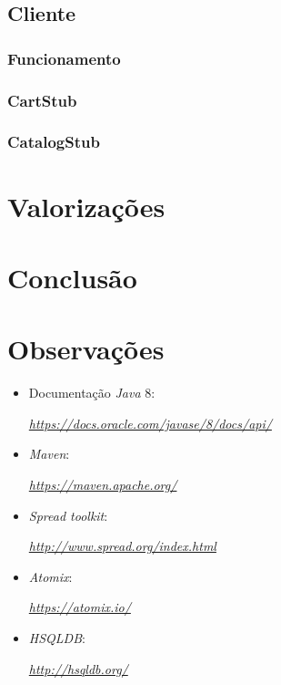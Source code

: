\documentclass[a4paper]{report}
\begin{document}
{	\section{Cliente} \label{sec:Client}
		\subsection{Funcionamento} \label{subsec:ClientWorking}
		\subsection{CartStub} \label{subsec:ClientCartStub}
		\subsection{CatalogStub} \label{subsec:ClientCatalogStub}
}

\chapter{Valorizações} \label{ch:ProblemDescription}
\large{
	
}

\chapter{Conclusão} \label{ch:Conclusion}
\large{
	
}

\appendix
\chapter{Observações} \label{ch:Observations}
\begin{itemize}
    \item Documentação \textit{Java} 8:
    \par \textit{\url{https://docs.oracle.com/javase/8/docs/api/}}
	\item \textit{Maven}:
	\par \textit{\url{https://maven.apache.org/}}
	\item \textit{Spread toolkit}:
	\par \textit{\url{http://www.spread.org/index.html}}
	\item \textit{Atomix}:
	\par \textit{\url{https://atomix.io/}}
	\item \textit{HSQLDB}:
	\par \textit{\url{http://hsqldb.org/}}
\end{itemize}
\end{document}

